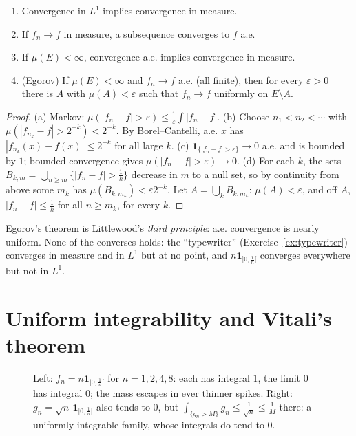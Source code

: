 \begin{proposition}\label{prop:modes}
\begin{enumerate}[label=(\alph*)]
\item Convergence in $L^1$ implies convergence in measure.
\item If $f_n\to f$ in measure, a subsequence converges to $f$ a.e.
\item If $\mu(E)<\infty$, convergence a.e. implies convergence in measure.
\item (Egorov) If $\mu(E)<\infty$ and $f_n\to f$ a.e. (all finite), then for every $\varepsilon>0$ there is $A$ with $\mu(A)<\varepsilon$ such that $f_n\to f$ uniformly on $E\setminus A$.
\end{enumerate}
\end{proposition}
\begin{proof}
(a) Markov: $\mu(|f_n-f|>\varepsilon)\le\frac1\varepsilon\int|f_n-f|$. (b) Choose $n_1<n_2<\cdots$ with $\mu(|f_{n_k}-f|>2^{-k})<2^{-k}$. By Borel--Cantelli, a.e. $x$ has $|f_{n_k}(x)-f(x)|\le2^{-k}$ for all large $k$.
(c) $\mathbf 1_{\{|f_n-f|>\varepsilon\}}\to0$ a.e. and is bounded by $1$; bounded convergence gives $\mu(|f_n-f|>\varepsilon)\to0$. (d) For each $k$, the sets $B_{k,m}=\bigcup_{n\ge m}\{|f_n-f|>\frac1k\}$ decrease in
$m$ to a null set, so by continuity from above some $m_k$ has $\mu(B_{k,m_k})<\varepsilon2^{-k}$. Let $A=\bigcup_kB_{k,m_k}$: $\mu(A)<\varepsilon$, and off $A$, $|f_n-f|\le\frac1k$ for all $n\ge m_k$, for every $k$.
\end{proof}

Egorov's theorem is Littlewood's \emph{third principle}: a.e. convergence is nearly uniform. None of the converses holds: the ``typewriter'' (Exercise~\ref{ex:typewriter})
converges in measure and in $L^1$ but at no point, and $n\mathbf 1_{]0,\frac1n[}$ converges everywhere but not in $L^1$.

\section{Uniform integrability and Vitali's theorem}\label{sec:ui}

\begin{figure}[ht]
\centering
{}
\caption{Left: $f_n=n\mathbf 1_{]0,\frac1n[}$ for $n=1,2,4,8$: each has integral $1$, the limit $0$ has integral $0$; the mass escapes in ever thinner spikes. Right: $g_n=\sqrt n\,\mathbf 1_{]0,\frac1n[}$
also tends to $0$, but $\int_{\{g_n>M\}}g_n\le\frac1{\sqrt n}\le\frac1M$ there: a uniformly integrable family, whose integrals do tend to $0$.}
\label{fig:escape}
\end{figure}

